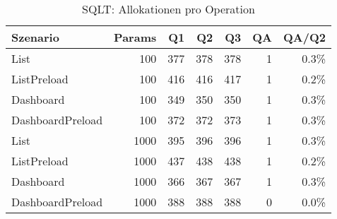 \begin{table}[ht]
\centering
\caption{SQLT: Allokationen pro Operation}
\begin{tabular}{lrrrrrr}
\toprule
Szenario & Params & Q1 & Q2 & Q3 & QA & QA/Q2 \\
\midrule
		List & 100 & 377 & 378 & 378 & 1 & 0.3\% \\
		ListPreload & 100 & 416 & 416 & 417 & 1 & 0.2\% \\
		Dashboard & 100 & 349 & 350 & 350 & 1 & 0.3\% \\
		DashboardPreload & 100 & 372 & 372 & 373 & 1 & 0.3\% \\
		List & 1000 & 395 & 396 & 396 & 1 & 0.3\% \\
		ListPreload & 1000 & 437 & 438 & 438 & 1 & 0.2\% \\
		Dashboard & 1000 & 366 & 367 & 367 & 1 & 0.3\% \\
		DashboardPreload & 1000 & 388 & 388 & 388 & 0 & 0.0\% \\
\bottomrule
\end{tabular}
\label{tab:benchmark_sqlt_allocsperop}
\end{table}
	